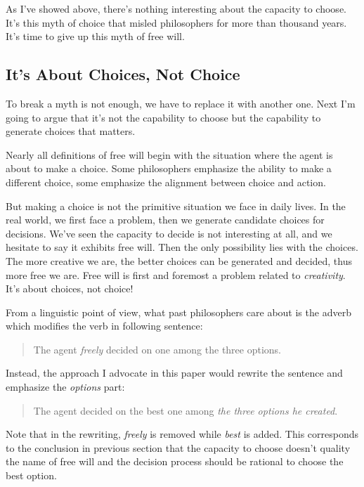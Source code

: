 As I've showed above, there's nothing interesting about the capacity to choose. It's this myth of choice that misled philosophers for more than thousand years. It's time to give up this myth of free will.

\subsection{It's About Choices, Not Choice}

To break a myth is not enough, we have to replace it with another one. Next I'm going to argue that it's not the capability to choose but the capability to generate choices that matters.

Nearly all definitions of free will begin with the situation where the agent is about to make a choice. Some philosophers emphasize the ability to make a different choice, some emphasize the alignment between choice and action.

But making a choice is not the primitive situation we face in daily lives. In the real world, we first face a problem, then we generate candidate choices for decisions. We've seen the capacity to decide is not interesting at all, and we hesitate to say it exhibits free will. Then the only possibility lies with the choices. The more creative we are, the better choices can be generated and decided, thus more free we are. Free will is first and foremost a problem related to \emph{creativity}. It's about choices, not choice!

From a linguistic point of view, what past philosophers care about is the adverb which modifies the verb in following sentence:

\begin{quote}
  The agent \emph{freely} decided on one among the three options.
\end{quote}

Instead, the approach I advocate in this paper would rewrite the sentence and emphasize the \emph{options} part:

\begin{quote}
  The agent decided on the best one among \emph{the three options he created}.
\end{quote}

Note that in the rewriting, \emph{freely} is removed while \emph{best} is added. This corresponds to the conclusion in previous section that the capacity to choose doesn't quality the name of free will and the decision process should be rational to choose the best option.

